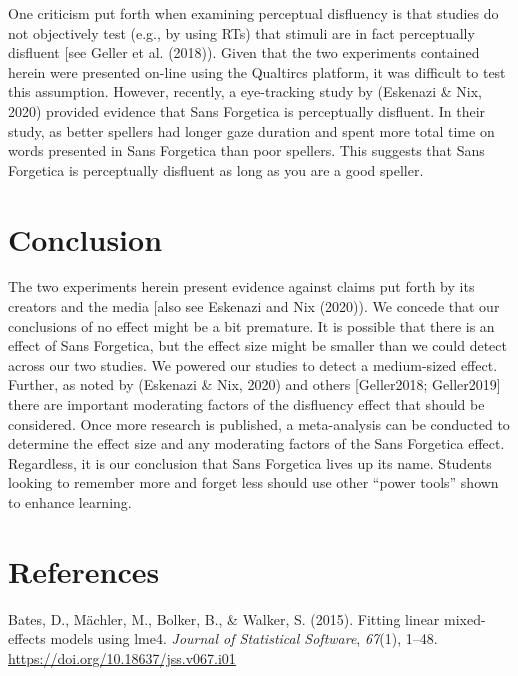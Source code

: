 \documentclass[english,pdf]{apa6}
\begin{document}
One criticism put forth when examining perceptual disfluency is that studies do not objectively test (e.g., by using RTs) that stimuli are in fact perceptually disfluent {[}see Geller et al. (2018)). Given that the two experiments contained herein were presented on-line using the Qualtircs platform, it was difficult to test this assumption. However, recently, a eye-tracking study by (Eskenazi \& Nix, 2020) provided evidence that Sans Forgetica is perceptually disfluent. In their study, as better spellers had longer gaze duration and spent more total time on words presented in Sans Forgetica than poor spellers. This suggests that Sans Forgetica is perceptually disfluent as long as you are a good speller.

\hypertarget{conclusion}{%
\section{Conclusion}\label{conclusion}}

The two experiments herein present evidence against claims put forth by its creators and the media {[}also see Eskenazi and Nix (2020)). We concede that our conclusions of no effect might be a bit premature. It is possible that there is an effect of Sans Forgetica, but the effect size might be smaller than we could detect across our two studies. We powered our studies to detect a medium-sized effect. Further, as noted by (Eskenazi \& Nix, 2020) and others {[}Geller2018; Geller2019{]} there are important moderating factors of the disfluency effect that should be considered. Once more research is published, a meta-analysis can be conducted to determine the effect size and any moderating factors of the Sans Forgetica effect. Regardless, it is our conclusion that Sans Forgetica lives up its name. Students looking to remember more and forget less should use other \enquote{power tools} shown to enhance learning.

\newpage

\hypertarget{references}{%
\section{References}\label{references}}

\begingroup
\setlength{\parindent}{-0.5in}
\setlength{\leftskip}{0.5in}

\hypertarget{refs}{}
\leavevmode\hypertarget{ref-Bates2015}{}%
Bates, D., Mächler, M., Bolker, B., \& Walker, S. (2015). Fitting linear mixed-effects models using lme4. \emph{Journal of Statistical Software}, \emph{67}(1), 1--48. \url{https://doi.org/10.18637/jss.v067.i01}
\end{document}

